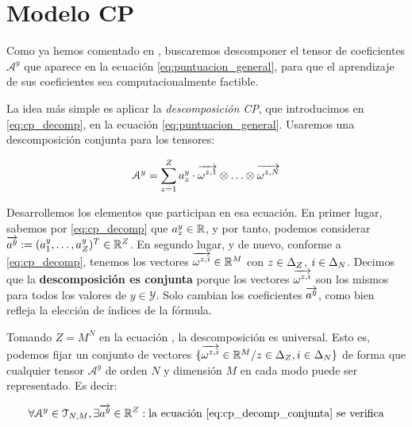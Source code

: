 \section{Modelo CP}

Como ya hemos comentado en , buscaremos descomponer el tensor de coeficientes $\mathcal{A}^y$ que aparece en la ecuación \eqref{eq:puntuacion_general}, para que el aprendizaje de sus coeficientes sea computacionalmente factible.

La idea más simple es aplicar la \textit{descomposición CP}, que introducimos en \eqref{eq:cp_decomp}, en la ecuación \eqref{eq:puntuacion_general}. Usaremos una descomposición conjunta para los tensores:

\begin{equation} \label{eq:cp_decomp_conjunta}
    \mathcal{A}^y = \sum_{z = 1}^Z a_z^y \cdot \overrightarrow{\omega^{z, 1}} \otimes \ldots \otimes \overrightarrow{\omega^{z, N}}
\end{equation}


Desarrollemos los elementos que participan en esa ecuación. En primer lugar, sabemos por \eqref{eq:cp_decomp} que $a_z^y \in \mathbb{R}$, y por tanto, podemos considerar $\overrightarrow{a^y} := (a_1^y, \ldots, a_Z^y)^T \in \mathbb{R}^Z$. En segundo lugar, y de nuevo, conforme a \eqref{eq:cp_decomp}, tenemos los vectores $\overrightarrow{\omega^{z, i}} \in \mathbb{R}^M$ con $z \in \Delta_{Z}$, $i \in \Delta_{N}$. Decimos que la \textbf{descomposición es conjunta} porque los vectores $\overrightarrow{\omega^{z, i}}$ son los mismos para todos los valores de $y \in \mathcal{Y}$. Solo cambian los coeficientes $\overrightarrow{a^y}$, como bien refleja la elección de índices de la fórmula.

\begin{proposicion}
    Tomando $Z = M^N$ en la ecuación , la descomposición es universal. Esto es, podemos fijar un conjunto de vectores $\{\overrightarrow{\omega^{z, i}} \in \mathbb{R}^M / z \in \Delta_{Z}, i \in \Delta_{N} \}$ de forma que cualquier tensor $\mathcal{A}^y$ de orden $N$ y dimensión $M$ en cada modo puede ser representado. Es decir:

    \begin{equation}
        \forall \mathcal{A}^y \in \espaciotensores{N}{M}, \exists \nv{a^y} \in \R^Z: \text{la ecuación \refeq{eq:cp_decomp_conjunta} se verifica}
    \end{equation}
\end{proposicion}


